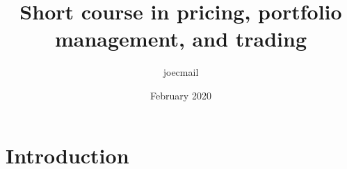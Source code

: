 \documentclass{article}
\title{Short course in pricing, portfolio management, and trading}
\author{joecmail }
\date{February 2020}
\begin{document}
\maketitle

\section{Introduction}
\end{document}
